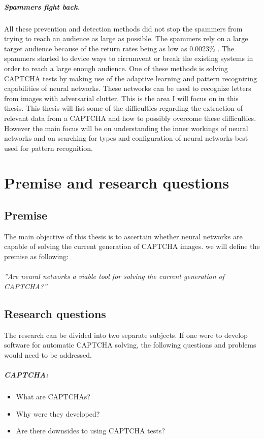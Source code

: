 \documentclass[pdftex,a4paper,12pt,twoside]{report}
\theoremstyle{plain} \newtheorem{theorem}{Theorem} \newtheorem{proposition}{Proposition} \newtheorem{lemma}{Lemma} \newtheorem*{corollary}{Corollary}
\theoremstyle{definition} \newtheorem{definition}{Definition} \newtheorem{conjecture}{Conjecture} \newtheorem*{example}{Example} \newtheorem{algorithm}{Algorithm}
\theoremstyle{remark} \newtheorem*{remark}{Remark} \newtheorem*{note}{Note} \newtheorem{case}{Case}
\newcommand{\captcha}{CAPTCHA}
\begin{document}
\paragraph{Spammers fight back.}
All these prevention and detection methods did not stop the spammers from trying to reach an audience as large  as possible. The spammers rely on a large target audience because of the return rates being as low as 0.0023\% \citep{Cobb2003}. The spammers started to device ways to circumvent or break the existing systems in order to reach a large enough audience. One of these methods is solving CAPTCHA tests by making use of the adaptive learning and pattern recognizing capabilities of neural networks. These networks can be used to recognize letters from images with adversarial clutter.
This is the area I will focus on in this thesis. This thesis will list some of the difficulties regarding the extraction of relevant data from a CAPTCHA and how to possibly overcome these difficulties. However the main focus will be on understanding the inner workings of neural networks and on searching for types and configuration of neural networks best used for pattern recognition.
\cleardoublepage
\chapter{Premise and research questions}
\label{ch:Premise}
\section{Premise}
\label{sec:Premise}
The main objective of this thesis is to ascertain whether neural networks are capable of solving the current generation of CAPTCHA images. we will define the premise  as following:\\\\
\emph{''Are neural networks a viable tool for solving the current generation of CAPTCHA?''}
\section{Research questions}
\label{sec:researquestions}
The research can be divided into two separate subjects. If one were to develop software for automatic CAPTCHA solving, the following questions and problems would need to be addressed.
\paragraph{\captcha :}
\begin{itemize}
\item What are CAPTCHAs?
\item Why were they developed?
\item Are there downsides to using CAPTCHA tests?
\end{itemize}
\end{document}
